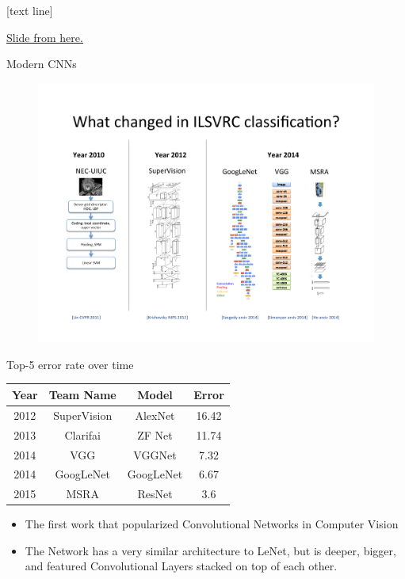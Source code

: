 \documentclass{beamer}
\newcommand{\referencefootnote}[1]{\setbeamertemplate{footline}[text line]{%
\parbox{0.9\paperwidth}{\vspace*{-23pt}\tiny{\textcolor{gray}{#1}}\hfill\scriptsize\insertframenumber}}}
\begin{document}
	{ \referencefootnote{\href{http://ai.stanford.edu/~olga/slides/berkeley_ilsvrc_2014.pdf}{Slide from \underline{here}.}}
		\begin{frame}{Modern CNNs}
		\begin{figure}
            \centering
            \includegraphics[width=0.8\linewidth]{figures/netsoverview.pdf}
        \end{figure}
	\end{frame}
	}

	\begin{frame}{Top-5 error rate over time}%
	\begin{center}
	\begin{table}
	\begin{tabular}{ c c c c } 
	 Year & Team Name & Model & Error \\ 
	\hline
	\color{red}2012 & \color{red}SuperVision  & \color{red}AlexNet &  {\color{red} 16.42  } \\ 
	2013 & Clarifai     & ZF Net &  {\color{red} 11.74  } \\ 
	2014 & VGG         &  VGGNet &  {\color{red} 7.32  } \\ 
	2014 & GoogLeNet   & GoogLeNet &  {\color{red}  6.67  } \\ 
	2015 & MSRA          & ResNet &  {\color{red} 3.6  } \\  
	\end{tabular}
	\end{table}  
	\end{center}

	\begin{itemize}
	\item The first work that popularized Convolutional Networks in Computer Vision
	\item The Network has a very similar architecture to LeNet, but is deeper, bigger, and featured Convolutional Layers stacked on top of each other.
	\end{itemize} 
	\end{frame}
	
\end{document}
